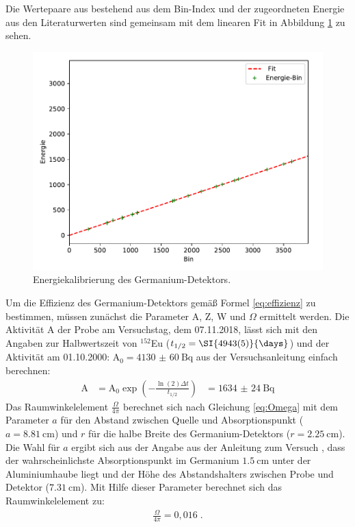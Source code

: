 \noindent Die Wertepaare aus bestehend aus dem Bin-Index und der zugeordneten Energie aus den Literaturwerten sind gemeinsam mit dem linearen Fit in Abbildung \ref{abb:linfit} zu sehen.

\FloatBarrier
\begin{figure}
    \centering
    \includegraphics[scale=0.7]{Kalibrierung.pdf}
    \caption{Energiekalibrierung des Germanium-Detektors.}
    \label{abb:linfit}
\end{figure}
\FloatBarrier

\noindent Um die Effizienz des Germanium-Detektors gemäß Formel \ref{eq:effizienz} zu bestimmen, müssen zunächst die Parameter A, Z, W und $\Omega$ ermittelt werden.
Die Aktivität A der Probe am Versuchstag, dem 07.11.2018, lässt sich mit den Angaben zur Halbwertszeit von $^{152}$Eu ($t_{1/2}=\SI{4943(5)}{\days}$) und der Aktivität am 01.10.2000: $\text{A}_0= \SI{4130(60)}{\becquerel}$ aus der Versuchsanleitung \cite{Q1} einfach berechnen:
\begin{align*}
    \text{A} &= \text{A}_0 \exp \left(-\frac{\ln(2) \Delta t}{t_{1/2}}\right)
    &= \SI{1634(24)}{\becquerel}
\end{align*}
Das Raumwinkelelement $\frac{\Omega}{4 \pi}$ berechnet sich nach Gleichung \ref{eq:Omega} mit dem Parameter $a$ für den Abstand zwischen Quelle und Absorptionspunkt ($a=\SI{8,81}{\centi\meter}$) und $r$ für die halbe Breite des Germanium-Detektors ($r= \SI{2,25}{\centi \meter}$). Die Wahl für $a$ ergibt sich aus der Angabe aus der Anleitung zum Versuch \cite{Q1}, dass der wahrscheinlichste Absorptionspunkt im Germanium $\SI{1,5}{\centi \meter}$ unter der Aluminiumhaube liegt und der Höhe des Abstandshalters zwischen Probe und Detektor ($\SI{7,31}{\centi \meter}$).
Mit Hilfe dieser Parameter berechnet sich das Raumwinkelelement zu:
\begin{align*}
    \frac{\Omega}{4 \pi} = 0,016 \; .
\end{align*}

